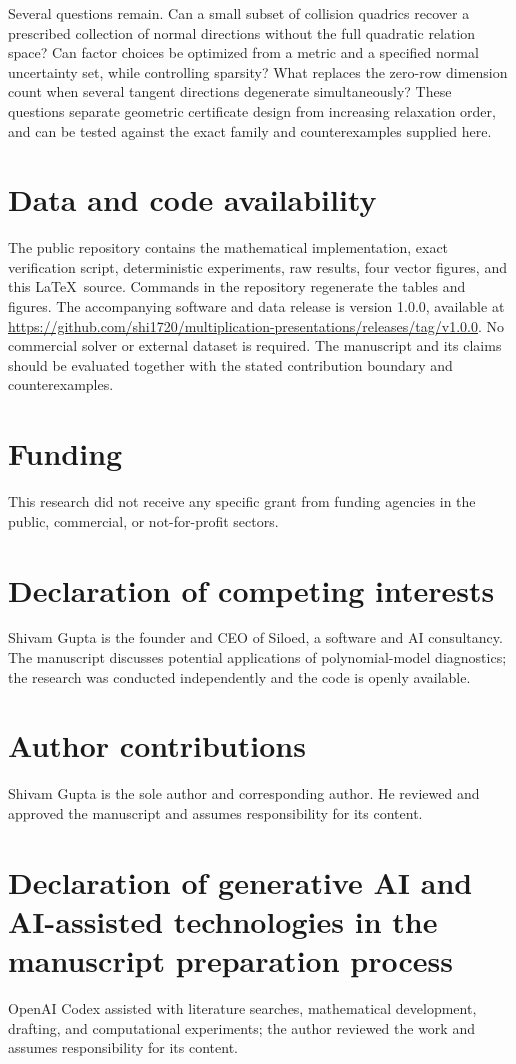 \documentclass[11pt]{article}
\theoremstyle{definition}\newtheorem{definition}[theorem]{Definition}
\theoremstyle{remark}\newtheorem{remark}[theorem]{Remark}
\begin{document}
Several questions remain. Can a small subset of collision quadrics recover a prescribed collection of normal directions without the full quadratic relation space? Can factor choices be optimized from a metric and a specified normal uncertainty set, while controlling sparsity? What replaces the zero-row dimension count when several tangent directions degenerate simultaneously? These questions separate geometric certificate design from increasing relaxation order, and can be tested against the exact family and counterexamples supplied here.

\section*{Data and code availability}
The public repository contains the mathematical implementation, exact verification script, deterministic experiments, raw results, four vector figures, and this \LaTeX\ source. Commands in the repository regenerate the tables and figures. The accompanying software and data release is version 1.0.0, available at \url{https://github.com/shi1720/multiplication-presentations/releases/tag/v1.0.0}. No commercial solver or external dataset is required. The manuscript and its claims should be evaluated together with the stated contribution boundary and counterexamples.

\section*{Funding}
This research did not receive any specific grant from funding agencies in the public, commercial, or not-for-profit sectors.

\section*{Declaration of competing interests}
Shivam Gupta is the founder and CEO of Siloed, a software and AI consultancy. The manuscript discusses potential applications of polynomial-model diagnostics; the research was conducted independently and the code is openly available.

\section*{Author contributions}
Shivam Gupta is the sole author and corresponding author. He reviewed and approved the manuscript and assumes responsibility for its content.

\section*{Declaration of generative AI and AI-assisted technologies in the manuscript preparation process}
OpenAI Codex assisted with literature searches, mathematical development, drafting, and computational experiments; the author reviewed the work and assumes responsibility for its content.
\end{document}
